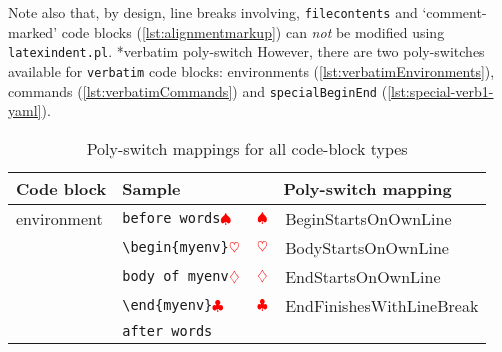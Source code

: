 	Note also that, by design, line breaks involving, \texttt{filecontents} and
	`comment-marked' code blocks (\vref{lst:alignmentmarkup}) can \emph{not} be modified
	using \texttt{latexindent.pl}. *{verbatim poly-switch} However,
	there are two poly-switches available for \texttt{verbatim} code blocks: environments
	(\vref{lst:verbatimEnvironments}), commands (\vref{lst:verbatimCommands}) and
	\texttt{specialBeginEnd} (\vref{lst:special-verb1-yaml}).
	 

	\clearpage
	\begin{longtable}{llll}
		\caption{Poly-switch mappings for all code-block types}\label{tab:poly-switch-mapping}                                                                                                                                                   \\
		\toprule
		Code block                                             & Sample                                                            & \multicolumn{2}{c}{Poly-switch mapping}                                                                     \\
		\midrule
		environment                                            & \verb!before words!$\color{red}\spadesuit$                        & $\color{red}\spadesuit$                 & BeginStartsOnOwnLine                                              \\
		                                                       & \verb!\begin{myenv}!$\color{red}\heartsuit$                        & $\color{red}\heartsuit$                  & BodyStartsOnOwnLine                                               \\
		                                                       & \verb!body of myenv!$\color{red}\diamondsuit$                         & $\color{red}\diamondsuit$                   & EndStartsOnOwnLine                                                \\
		                                                       & \verb!\end{myenv}!$\color{red}\clubsuit$                     & $\color{red}\clubsuit$             & EndFinishesWithLineBreak                                          \\
		                                                       & \verb!after words!                                                &                                         &                                                                   \\

\end{longtable}
